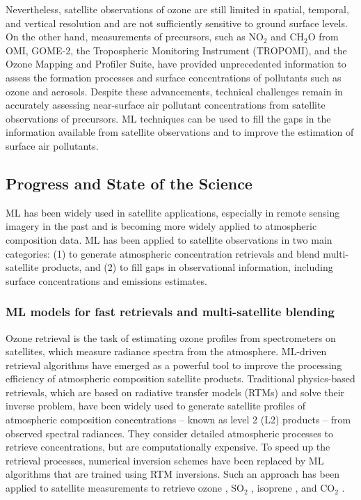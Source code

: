 \documentclass[gmd, manuscript]{copernicus}
\begin{document}
Nevertheless, satellite observations of ozone are still limited in spatial, temporal, and vertical resolution and are not sufficiently sensitive to ground surface levels. On the other hand, measurements of precursors, such as NO$_2$ and CH$_2$O from OMI, GOME-2, the Tropospheric Monitoring Instrument (TROPOMI), and the Ozone Mapping and Profiler Suite, have provided unprecedented information to assess the formation processes and surface concentrations of pollutants such as ozone and aerosols. Despite these advancements, technical challenges remain in accurately assessing near-surface air pollutant concentrations from satellite observations of precursors. ML techniques can be used to fill the gaps in the information available from satellite observations and to improve the estimation of surface air pollutants.

\subsection{Progress and State of the Science}

ML has been widely used in satellite applications, especially in remote sensing imagery \citep{maxwell_implementation_2018} in the past and is becoming more widely applied to atmospheric composition data. ML has been applied to satellite observations in two main categories: (1) to generate atmospheric concentration retrievals and blend multi-satellite products, and (2) to fill gaps in observational information, including surface concentrations and emissions estimates. 

\subsubsection{ML models for fast retrievals and multi-satellite blending}

Ozone retrieval is the task of estimating ozone profiles from spectrometers on satellites, which measure radiance spectra from the atmosphere. ML-driven retrieval algorithms have emerged as a powerful tool to improve the processing efficiency of atmospheric composition satellite products. Traditional physics-based retrievals, which are based on radiative transfer models (RTMs) and solve their inverse problem, have been widely used to generate satellite profiles of atmospheric composition concentrations -- known as level 2 (L2) products -- from observed spectral radiances. They consider detailed atmospheric processes to retrieve concentrations, but are computationally expensive. To speed up the retrieval processes, numerical inversion schemes have been replaced by ML algorithms that are trained using RTM inversions. Such an approach has been applied to satellite measurements to retrieve ozone \citep[e.g.,][]{muller_ozone_2003}, SO$_2$ \citep[e.g.,][]{li_new_2022}, isoprene \citep[e.g.,][]{wells_next-generation_2022}, and CO$_2$ \citep[e.g.,][]{xie_fast_2024}. 
\end{document}
